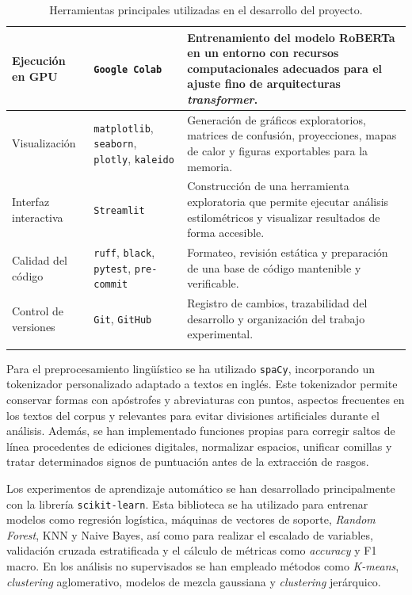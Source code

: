 \documentclass[IB]{TFUOC}%
\begin{document}
\begin{longtable}{|p{3.6cm}|>{\raggedright\arraybackslash}p{4.2cm}|p{7cm}|}
Ejecución en GPU &
\texttt{Google Colab} &
Entrenamiento del modelo RoBERTa en un entorno con recursos computacionales adecuados para el ajuste fino de arquitecturas \textit{transformer}. \\
\hline

Visualización &
\texttt{matplotlib}, \texttt{seaborn}, \texttt{plotly}, \texttt{kaleido} &
Generación de gráficos exploratorios, matrices de confusión, proyecciones, mapas de calor y figuras exportables para la memoria. \\
\hline

Interfaz interactiva &
\texttt{Streamlit} &
Construcción de una herramienta exploratoria que permite ejecutar análisis estilométricos y visualizar resultados de forma accesible. \\
\hline

Calidad del código &
\texttt{ruff}, \texttt{black}, \texttt{pytest}, \texttt{pre-commit} &
Formateo, revisión estática y preparación de una base de código mantenible y verificable. \\
\hline

Control de versiones &
\texttt{Git}, \texttt{GitHub} &
Registro de cambios, trazabilidad del desarrollo y organización del trabajo experimental. \\
\hline

\caption{Herramientas principales utilizadas en el desarrollo del proyecto.}
\label{tab:herramientas}
\end{longtable}

Para el preprocesamiento lingüístico se ha utilizado \texttt{spaCy}, incorporando un tokenizador personalizado adaptado a textos en inglés. Este tokenizador permite conservar formas con apóstrofes y abreviaturas con puntos, aspectos frecuentes en los textos del corpus y relevantes para evitar divisiones artificiales durante el análisis. Además, se han implementado funciones propias para corregir saltos de línea procedentes de ediciones digitales, normalizar espacios, unificar comillas y tratar determinados signos de puntuación antes de la extracción de rasgos.

Los experimentos de aprendizaje automático se han desarrollado principalmente con la librería \texttt{scikit-learn}. Esta biblioteca se ha utilizado para entrenar modelos como regresión logística, máquinas de vectores de soporte, \textit{Random Forest}, KNN y Naive Bayes, así como para realizar el escalado de variables, validación cruzada estratificada y el cálculo de métricas como \textit{accuracy} y F1 macro. En los análisis no supervisados se han empleado métodos como \textit{K-means}, \textit{clustering} aglomerativo, modelos de mezcla gaussiana y \textit{clustering} jerárquico.
\end{document}
